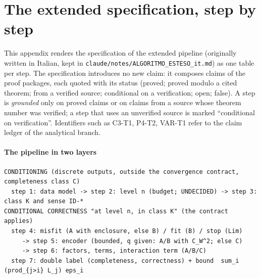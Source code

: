 \section{The extended specification, step by step}\label{app:spec}
This appendix renders the specification of the extended pipeline (originally written in Italian, kept in \texttt{claude/notes/ALGORITMO\_ESTESO\_it.md}) as one table per step. The specification introduces no new claim: it composes claims of the proof packages, each quoted with its status (proved; proved modulo a cited theorem; from a verified source; conditional on a verification; open; false).
A step is \emph{grounded} only on proved claims or on claims from a source whose theorem number was verified; a step that uses an unverified source is marked ``conditional on verification''. Identifiers such as C3-T1, P4-T2, VAR-T1 refer to the claim ledger of the analytical branch.

\paragraph{The pipeline in two layers}
\begin{verbatim}
CONDITIONING (discrete outputs, outside the convergence contract, completeness class C)
  step 1: data model -> step 2: level n (budget; UNDECIDED) -> step 3: class K and sense ID-*
CONDITIONAL CORRECTNESS "at level n, in class K" (the contract applies)
  step 4: misfit (A with enclosure, else B) / fit (B) / stop (Lim)
     -> step 5: encoder (bounded, q given: A/B with C_W^2; else C)
     -> step 6: factors, terms, interaction term (A/B/C)
  step 7: double label (completeness, correctness) + bound  sum_i (prod_{j>i} L_j) eps_i
\end{verbatim}

